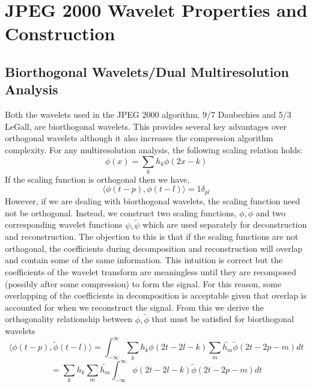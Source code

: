 \documentclass{article}
\begin{document}
\section{JPEG 2000 Wavelet Properties and \mbox{Construction}}
\subsection{Biorthogonal Wavelets/Dual Multiresolution Analysis}
Both the wavelets used in the JPEG 2000 algorithm, 9/7 Daubechies and 5/3 LeGall, are biorthogonal wavelets. This provides several key advantages over orthogonal wavelets although it also increases the compression algorithm complexity.
For any multiresolution analysis, the following scaling relation holds:
\[\phi(x)=\sum_{k}h_{k}\phi(2x-k)\]
If the scaling function is orthogonal then we have,
\[\langle\phi(t-p),\phi(t-l)\rangle=1\delta_{pl}\]
However, if we are dealing with biorthogonal wavelets, the scaling function need not be orthogonal. Instead, we construct two scaling functions, \(\phi,\tilde{\phi}\) and two corresponding wavelet functions \(\psi,\tilde{\psi}\) which are used separately for deconstruction and reconstruction. The objection to this is that if the scaling functions are not orthogonal, the coefficients during decomposition and reconstruction will overlap and contain some of the same information. This intuition is correct but the coefficients of the wavelet transform are meaningless until they are recomposed (possibly after some compression) to form the signal. For this reason, some overlapping of the coefficients in decomposition is acceptable given that overlap is accounted for when we reconstruct the signal. From this we derive the orthogonality relationship between  \(\phi,\tilde{\phi}\) that must be satisfied for biorthogonal wavelets
\[\langle\phi(t-p),\tilde{\phi}(t-l)\rangle=\int_{-\infty}^{\infty}\sum_{k}h_{k}\phi(2t-2l-k)\sum_{m}\tilde{h_{m}}\tilde{\phi}(2t-2p-m)dt\]
\[=\sum_{k}h_{k}\sum_{m}\tilde{h_{m}}\int_{-\infty}^{\infty}\phi(2t-2l-k)\tilde{\phi}(2t-2p-m)dt\]
\end{document}
